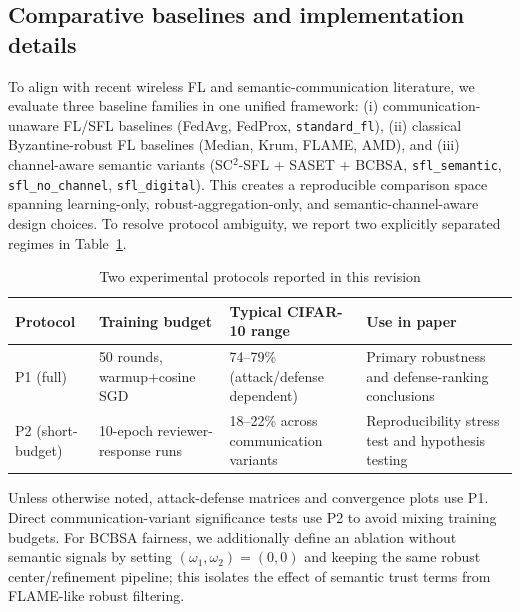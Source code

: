 \documentclass[10pt,journal]{IEEEtran}
\begin{document}
\subsection{Comparative baselines and implementation details}
To align with recent wireless FL and semantic-communication literature, we evaluate three baseline families in one unified framework: (i) communication-unaware FL/SFL baselines (FedAvg, FedProx, \texttt{standard\_fl}), (ii) classical Byzantine-robust FL baselines (Median, Krum, FLAME, AMD), and (iii) channel-aware semantic variants (SC$^2$-SFL + SASET + BCBSA, \texttt{sfl\_semantic}, \texttt{sfl\_no\_channel}, \texttt{sfl\_digital}). This creates a reproducible comparison space spanning learning-only, robust-aggregation-only, and semantic-channel-aware design choices\cite{8736011,11134601,9398576,10798108}.
To resolve protocol ambiguity, we report two explicitly separated regimes in Table~\ref{tab:protocols}.
\begin{table}[htbp]
\centering
\caption{Two experimental protocols reported in this revision}
\label{tab:protocols}
\footnotesize
\setlength{\tabcolsep}{3.5pt}
\begin{tabular}{p{}p{}p{}p{}}
\toprule
\textbf{Protocol} & \textbf{Training budget} & \textbf{Typical CIFAR-10 range} & \textbf{Use in paper} \\
\midrule
P1 (full) & 50 rounds, warmup+cosine SGD & 74--79\% (attack/defense dependent) & Primary robustness and defense-ranking conclusions \\
P2 (short-budget) & 10-epoch reviewer-response runs & 18--22\% across communication variants & Reproducibility stress test and hypothesis testing \\
\bottomrule
\end{tabular}
\end{table}
Unless otherwise noted, attack-defense matrices and convergence plots use P1. Direct communication-variant significance tests use P2 to avoid mixing training budgets.
For BCBSA fairness, we additionally define an ablation without semantic signals by setting $(\omega_1,\omega_2)=(0,0)$ and keeping the same robust center/refinement pipeline; this isolates the effect of semantic trust terms from FLAME-like robust filtering.
\end{document}
